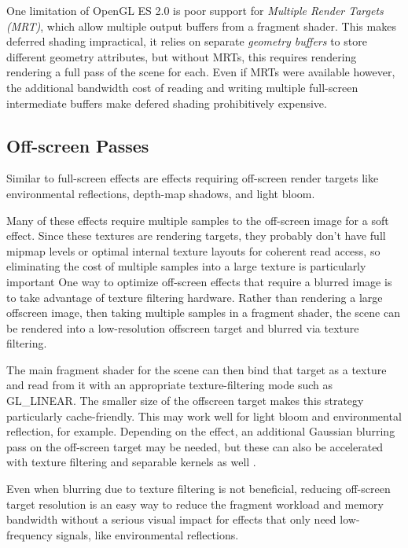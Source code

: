 
One limitation of OpenGL ES 2.0 is poor support for \textit{Multiple Render
Targets (MRT)}, which allow multiple output buffers from a fragment shader.
This makes deferred shading impractical, it relies on separate \textit{geometry
buffers} to store different geometry attributes, but without MRTs, this
requires rendering rendering a full pass of the scene for each.  Even if MRTs
were available however, the additional bandwidth cost of reading and writing
multiple full-screen intermediate buffers make defered shading prohibitively expensive.

\subsection{Off-screen Passes}
\label{Jon-McCaffrey-Off-Screen-Pass}

Similar to full-screen effects are effects requiring off-screen render targets
like environmental reflections, depth-map shadows, and light bloom.

Many of these effects require multiple samples to the off-screen image for a
soft effect.  Since these textures are rendering targets, they probably don't
have full mipmap levels or optimal internal texture layouts for coherent read
access, so eliminating the cost of multiple samples into a large texture is
particularly important One way to optimize off-screen effects that require a
blurred image is to take advantage of texture filtering hardware.  Rather than
rendering a large offscreen image, then taking multiple samples in a fragment
shader, the scene can be rendered into a low-resolution offscreen target and
blurred via texture filtering.

The main fragment shader for the scene can then bind that target as a texture
and read from it with an appropriate texture-filtering mode such as GL\_LINEAR.
The smaller size of the offscreen target makes this strategy particularly
cache-friendly.  This may work well for light bloom and environmental
reflection, for example.  Depending on the effect, an additional Gaussian
blurring pass on the off-screen target may be needed, but these can also be
accelerated with texture filtering and separable kernels as well \cite{Rideout}.

Even when blurring due to texture filtering is not beneficial, reducing
off-screen target resolution is an easy way to reduce the fragment workload
and memory bandwidth without a serious visual impact for effects that only need
low-frequency signals, like environmental reflections.

